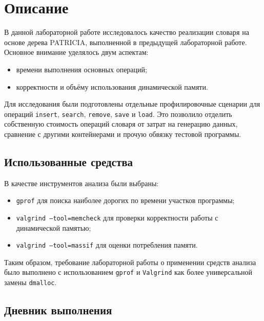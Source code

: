 \section{Описание}

В данной лабораторной работе исследовалось качество реализации словаря на основе дерева PATRICIA, выполненной в предыдущей лабораторной работе. Основное внимание уделялось двум аспектам:
\begin{itemize}
    \item времени выполнения основных операций;
    \item корректности и объёму использования динамической памяти.
\end{itemize}

Для исследования были подготовлены отдельные профилировочные сценарии для операций \texttt{insert}, \texttt{search}, \texttt{remove}, \texttt{save} и \texttt{load}. Это позволило отделить собственную стоимость операций словаря от затрат на генерацию данных, сравнение с другими контейнерами и прочую обвязку тестовой программы.

\subsection{Использованные средства}

В качестве инструментов анализа были выбраны:
\begin{itemize}
    \item \texttt{gprof} для поиска наиболее дорогих по времени участков программы;
    \item \texttt{valgrind --tool=memcheck} для проверки корректности работы с динамической памятью;
    \item \texttt{valgrind --tool=massif} для оценки потребления памяти.
\end{itemize}

Таким образом, требование лабораторной работы о применении средств анализа было выполнено с использованием \texttt{gprof} и \texttt{Valgrind} как более универсальной замены \texttt{dmalloc}.

\subsection{Дневник выполнения}

